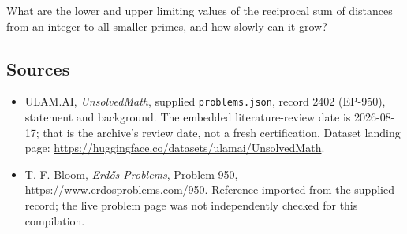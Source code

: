 \documentclass[11pt,a4paper]{article}
\begin{document}
What are the lower and upper limiting values of the reciprocal sum of distances from an integer to all smaller primes, and how slowly can it grow?

\subsection{Sources}

{\small

\begin{itemize}

\item[\hypertarget{source:2402:1}{S1}] ULAM.AI, \emph{UnsolvedMath}, supplied \texttt{problems.json}, record 2402 (EP-950), statement and background. The embedded literature-review date is 2026-08-17; that is the archive’s review date, not a fresh certification. Dataset landing page: \url{https://huggingface.co/datasets/ulamai/UnsolvedMath}.

\item[\hypertarget{source:2402:2}{S2}] T. F. Bloom, \emph{Erdős Problems}, Problem 950, \url{https://www.erdosproblems.com/950}. Reference imported from the supplied record; the live problem page was not independently checked for this compilation.

\end{itemize}

}

\label{end:2402}
\end{document}
